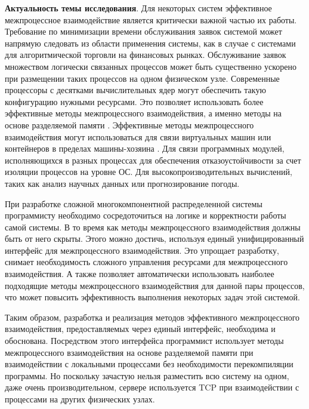 \startprefacepage

\textbf{Актуальность темы исследования}.
Для некоторых систем эффективное межпроцессное взаимодействие является критически важной частью их работы. Требование по минимизации времени обслуживания заявок системой может напрямую следовать из области применения системы, как в случае с системами для алгоритмической торговли на финансовых рынках. Обслуживание заявок множеством логически связанных процессов может быть существенно ускорено при размещении таких процессов на одном физическом узле. Современные процессоры с десятками вычислительных ядер могут обеспечить такую конфигурацию нужными ресурсами.
Это позволяет использовать более эффективные методы межпроцессного взаимодействия, а именно методы на основе разделяемой памяти \cite{Smith2012DraftH}.
Эффективные методы межпроцессного взаимодействия могут использоваться для связи виртуальных машин или контейнеров в пределах машины-хозяина \cite{IPCInterVirtualMachineShmem, IPCInterVirtualMachineShmemOptimizations}.
Для связи программных модулей, исполняющихся в разных процессах для обеспечения отказоустойчивости за счет изоляции процессов на уровне ОС. 
Для высокопроизводительных вычислений, таких как анализ научных данных или прогнозирование погоды.

При разработке сложной многокомпонентной распределенной системы программисту необходимо сосредоточиться на логике и корректности работы самой системы. В то время как методы межпроцессного взаимодействия должны быть от него скрыты. Этого можно достичь, используя единый унифицированный интерфейс для межпроцессного взаимодействия. Это упрощает разработку, снимает необходимость сложного управления ресурсами для межпроцессного взаимодействия. А также позволяет автоматически использовать наиболее подходящие методы межпроцессного взаимодействия для данной пары процессов, что может повысить эффективность выполнения некоторых задач этой системой.

Таким образом, разработка и реализация методов эффективного межпроцессного взаимодействия, предоставляемых через единый интерфейс, необходима и обоснована. Посредством этого интерфейса программист использует методы межпроцессного взаимодействия на основе разделяемой памяти при взаимодействии с локальными процессами без необходимости перекомпиляции программы. Но поскольку зачастую нельзя разместить всю систему на одном, даже очень производительном, сервере используется TCP при взаимодействии с процессами на других физических узлах.

